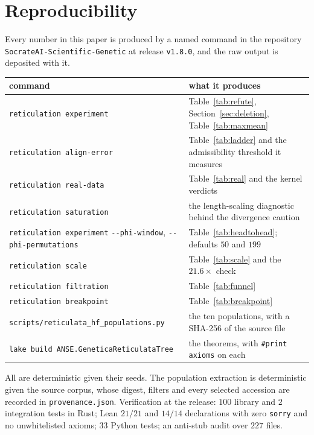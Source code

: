 \documentclass[11pt,a4paper]{article}
\theoremstyle{definition}
\theoremstyle{remark}
\begin{document}
\section{Reproducibility}\label{sec:repro}

Every number in this paper is produced by a named command in the repository
\texttt{SocrateAI-Scientific-Genetic} at release \texttt{v1.8.0}, and the raw
output is deposited with it.

\begin{center}\small
\begin{tabularx}{\textwidth}{@{}lX@{}}
\toprule
command & what it produces \\
\midrule
\texttt{reticulation experiment} & Table~\ref{tab:refute},
Section~\ref{sec:deletion}, Table~\ref{tab:maxmean} \\
\texttt{reticulation align-error} & Table~\ref{tab:ladder} and the admissibility
threshold it measures \\
\texttt{reticulation real-data} & Table~\ref{tab:real} and the kernel verdicts \\
\texttt{reticulation saturation} & the length-scaling diagnostic behind the
divergence caution \\
\texttt{reticulation experiment} \texttt{-{}-phi-window}, \texttt{-{}-phi-permutations}
& Table~\ref{tab:headtohead}; defaults $50$ and $199$ \\
\texttt{reticulation scale} & Table~\ref{tab:scale} and the $21.6\times$ check \\
\texttt{reticulation filtration} & Table~\ref{tab:funnel} \\
\texttt{reticulation breakpoint} & Table~\ref{tab:breakpoint} \\
\texttt{scripts/reticulata\_hf\_populations.py} & the ten populations, with a
SHA-256 of the source file \\
\texttt{lake build ANSE.GeneticaReticulataTree} & the theorems, with
\texttt{\#print axioms} on each \\
\bottomrule
\end{tabularx}
\end{center}

All are deterministic given their seeds. The population extraction is
deterministic given the source corpus, whose digest, filters and every selected
accession are recorded in \texttt{provenance.json}. Verification at the release:
$100$ library and $2$ integration tests in Rust; Lean $21/21$ and $14/14$
declarations with zero \texttt{sorry} and no unwhitelisted axioms; $33$ Python
tests; an anti-stub audit over $227$ files.
\end{document}
